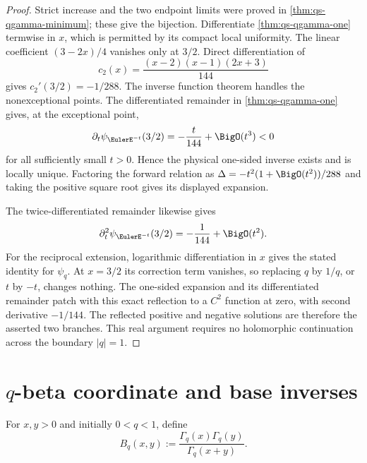 \begin{proof}
Strict increase and the two endpoint limits were proved in
\cref{thm:qs-qgamma-minimum}; these give the bijection.  Differentiate
\cref{thm:qs-qgamma-one} termwise in \(x\), which is permitted by its compact
local uniformity.  The linear coefficient
\((3-2x)/4\) vanishes only at \(3/2\).  Direct differentiation of
\[
  c_2(x)=\frac{(x-2)(x-1)(2x+3)}{144}
\]
gives \(c_2'(3/2)=-1/288\).  The inverse function theorem handles the
nonexceptional points.  The differentiated remainder in
\cref{thm:qs-qgamma-one} gives, at the exceptional point,
\[
 \partial_t\psi_{\EulerE^{-t}}(3/2)
 =-\frac{t}{144}+\BigO(t^3)<0
\]
for all sufficiently small \(t>0\).  Hence the physical one-sided inverse
exists and is locally unique.  Factoring the forward relation as
\(\Delta=-t^2(1+\BigO(t^2))/288\) and taking the positive square root gives
its displayed expansion.

The twice-differentiated remainder likewise gives
\[
 \partial_t^2\psi_{\EulerE^{-t}}(3/2)
 =-\frac1{144}+\BigO(t^2).
\]
For the reciprocal extension, logarithmic differentiation in \(x\) gives
the stated identity for \(\psi_q\).  At \(x=3/2\) its correction term
vanishes, so replacing \(q\) by \(1/q\), or \(t\) by \(-t\), changes
nothing.  The one-sided expansion and its differentiated remainder patch
with this exact reflection to a \(C^2\) function at zero, with second
derivative \(-1/144\).  The reflected positive and negative solutions are
therefore the asserted two branches.  This real argument requires no
holomorphic continuation across the boundary \(|q|=1\).
\end{proof}

\section{\texorpdfstring{\(q\)-beta coordinate and base inverses}{q-beta coordinate and base inverses}}
\label{sec:qs-qbeta}

For \(x,y>0\) and initially \(0<q<1\), define
\[
  B_q(x,y):=\frac{\Gamma_q(x)\Gamma_q(y)}{\Gamma_q(x+y)}.
\]


